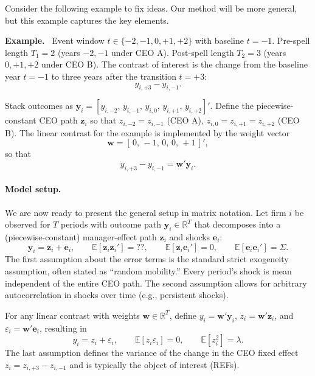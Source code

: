 \documentclass[11pt,a4paper]{article}
\begin{document}
\newenvironment{example}{\par\noindent\textbf{Example.}\ }{\par}

Consider the following example to fix ideas. Our method will be more general, but this example captures the key elements.
\begin{example}
Event window $t\in\{-2,-1,0,+1,+2\}$ with baseline $t=-1$. Pre-spell length $T_1=2$ (years $-2,-1$ under CEO A). Post-spell length $T_2=3$ (years $0, +1,+2$ under CEO B). The contrast of interest is the change from the baseline year $t=-1$ to three years after the transition $t=+3$:
\[
y_{i,+3} - y_{i,-1}.
\]
\end{example}

Stack outcomes as $\mathbf y_i=[y_{i,-2},\,y_{i,-1},\,y_{i,0},\,y_{i,+1},\,y_{i,+2}]'$. Define the piecewise-constant CEO path $\mathbf z_i$ so that $z_{i,-2}=z_{i,-1}$ (CEO A), $z_{i,0} = z_{i,+1}=z_{i,+2}$ (CEO B). The linear contrast for the example is implemented by the weight vector
\[
  \mathbf w = [\,0,\,-1,\,0,\,0,\,+1\,]',
\]
so that 
$$
y_{i,+3} - y_{i,-1} = \mathbf w' \mathbf y_i.
$$

\paragraph{Model setup.} We are now ready to present the general setup in matrix notation. Let firm $i$ be observed for $T$ periods with outcome path $\mathbf y_i\in\mathbb R^T$ that decomposes into a (piecewise-constant) manager-effect path $\mathbf z_i$ and shocks $\mathbf e_i$:
\begin{equation}
\mathbf y_i = \mathbf z_i + \mathbf e_i,
\qquad \mathbb E[\mathbf z_i\mathbf z_i']=??,
\qquad \mathbb E[\mathbf z_i\mathbf e_i']=0,
\qquad \mathbb E[\mathbf e_i\mathbf e_i']=\Sigma.
\end{equation}
The first assumption about the error terms is the standard strict exogeneity assumption, often stated as ``random mobility.'' Every period's shock is mean independent of the entire CEO path. The second assumption allows for arbitrary autocorrelation in shocks over time (e.g., persistent shocks).

For any linear contrast with weights $\mathbf w\in\mathbb R^T$, define $y_i=\mathbf w'\mathbf y_i$, $z_i=\mathbf w'\mathbf z_i$, and $\varepsilon_i=\mathbf w'\mathbf e_i$, resulting in
\begin{equation}
y_i = z_i + \varepsilon_i,
\qquad \mathbb E[z_i\varepsilon_i]=0,
\qquad \mathbb E[z_i^2] = \lambda.
\end{equation}
The last assumption defines the variance of the change in the CEO fixed effect $z_i = z_{i,+3} - z_{i,-1}$ and is typically the object of interest (REFs).
\end{document}
